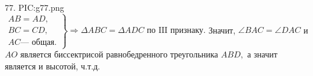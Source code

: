 77. {{PIC:g77.png}}\\
$\left.\begin{array}{l}AB=AD,\\
BC=CD,\\
AC\text{--- общая.}  \end{array}\right\}\Rightarrow \Delta ABC=\Delta ADC\text{ по III признаку.}$ Значит, $\angle BAC=\angle DAC$ и $AO$ является биссектрисой равнобедренного треугольника $ABD,$ а значит является и высотой, ч.т.д.\\
